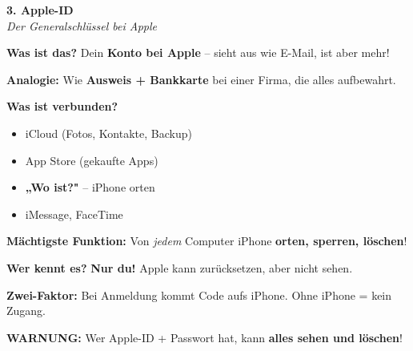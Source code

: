 \documentclass[a4paper,landscape,11pt]{article}
\begin{document}
\begin{minipage}[t]{0.32\linewidth}
\begin{center}
\colorbox{applered!10}{%
\begin{minipage}{0.95\linewidth}
\vspace{2mm}
\begin{center}
{\Large\bfseries\textcolor{applered}{3. Apple-ID}}\\[1pt]
{\footnotesize\itshape Der Generalschlüssel bei Apple}
\end{center}
\vspace{2mm}
\end{minipage}%
}
\end{center}

\vspace{1mm}

\textbf{Was ist das?} Dein \textbf{Konto bei Apple} -- sieht aus wie E-Mail, ist aber mehr!

\textbf{Analogie:} Wie \textbf{Ausweis + Bankkarte} bei einer Firma, die alles aufbewahrt.

\textbf{Was ist verbunden?}
\begin{itemize}
\item iCloud (Fotos, Kontakte, Backup)
\item App Store (gekaufte Apps)
\item \textbf{„Wo ist?"} -- iPhone orten
\item iMessage, FaceTime
\end{itemize}

\textbf{Mächtigste Funktion:} Von \textit{jedem} Computer iPhone \textbf{orten, sperren, löschen}!

\textbf{Wer kennt es?} \textbf{Nur du!} Apple kann zurücksetzen, aber nicht sehen.

\textbf{Zwei-Faktor:} Bei Anmeldung kommt Code aufs iPhone. Ohne iPhone = kein Zugang.

\textbf{WARNUNG:} Wer Apple-ID + Passwort hat, kann \textbf{alles sehen und löschen}!

\end{minipage}

\vspace{1mm}

\begin{center}
\end{center}
\end{document}
